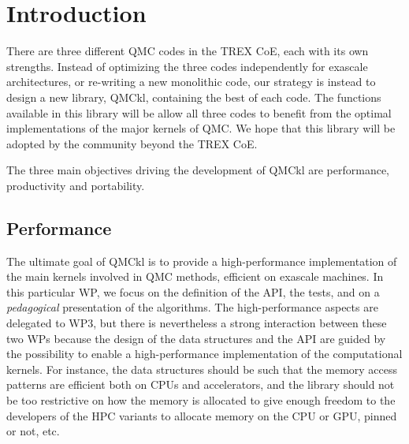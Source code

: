 \newcommand{\orgmode}{\texttt{org-mode}}
\newcommand{\Makefile}{\texttt{Makefile}}
\newcommand{\context}{\texttt{context}}
\newcommand{\CC}{C\nolinebreak\hspace{-.05em}\raisebox{.4ex}{\tiny\bf +}\nolinebreak\hspace{-.10em}\raisebox{.4ex}{\tiny\bf +}}
\def\CC{{C\nolinebreak[4]\hspace{-.05em}\raisebox{.4ex}{\tiny\bf ++}}}

\section{Introduction}

There are three different \ac{QMC} codes in the TREX \ac{CoE}, each
with its own strengths. Instead of optimizing the three codes
independently for exascale architectures, or re-writing a new
monolithic code, our strategy is instead to design a new library,
\ac{QMCkl}, containing the best of each code. The functions available
in this library will be allow all three codes to benefit from the
optimal implementations of the major kernels of \ac{QMC}. We hope that
this library will be adopted by the community beyond the \ac{TREX} \ac{CoE}.

The three main objectives driving the development of \ac{QMCkl} are
performance, productivity and portability.

\subsection{Performance}

The ultimate goal of \ac{QMCkl} is to provide a high-performance
implementation of the main kernels involved in \ac{QMC} methods,
efficient on exascale machines. 
In this particular \ac{WP}, we focus on the
definition of the \ac{API}, the tests, and on a \emph{pedagogical}
presentation of the algorithms. The high-performance aspects are
delegated to \ac{WP}3, but there is nevertheless a strong interaction
between these two \acp{WP} because the design of the data structures
and the \ac{API} are guided by the possibility to enable a
high-performance implementation of the computational kernels.
For instance, the data structures should be such that the memory
access patterns are efficient both on CPUs and accelerators, and the
library should not be too restrictive on how the memory is allocated
to give enough freedom to the developers of the \ac{HPC} variants to
allocate memory on the CPU or GPU, pinned or not, etc.

